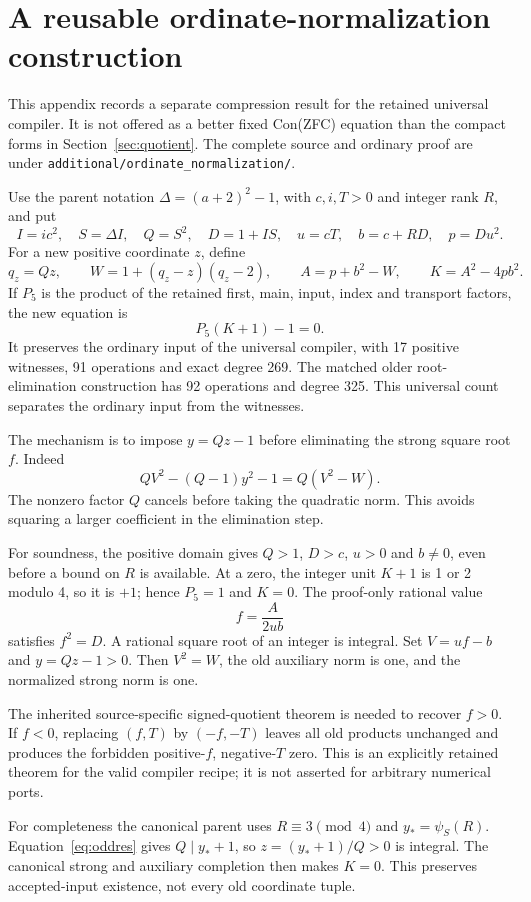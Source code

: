 \documentclass[11pt]{article}
\theoremstyle{remark}\newtheorem{remark}[theorem]{Remark}
\newcommand{\file}[1]{\nolinkurl{#1}}
\begin{document}


\section{A reusable ordinate-normalization construction}\label{app:ordinate}
This appendix records a separate compression result for the retained
universal compiler. It is not offered as a better fixed Con(ZFC)
equation than the compact forms in Section~\ref{sec:quotient}.
The complete source and ordinary proof are under
\file{additional/ordinate_normalization/}.

Use the parent notation $\Delta=(a+2)^2-1$, with $c,i,T>0$ and
integer rank $R$, and put
\[
 I=ic^2,\quad S=\Delta I,\quad Q=S^2,\quad D=1+IS,
 \quad u=cT,\quad b=c+RD,\quad p=Du^2.
\]
For a new positive coordinate $z$, define
\[
 q_z=Qz,\qquad W=1+(q_z-z)(q_z-2),\qquad
 A=p+b^2-W,\qquad K=A^2-4pb^2.
\]
If $P_5$ is the product of the retained first, main, input, index and
transport factors, the new equation is
\[
 P_5(K+1)-1=0.
\]
It preserves the ordinary input of the universal compiler, with 17
positive witnesses, 91 operations and exact degree 269. The matched
older root-elimination construction has 92 operations and degree 325.
This universal count separates the ordinary input from the witnesses.

The mechanism is to impose $y=Qz-1$ before eliminating the strong
square root $f$. Indeed
\[
 QV^2-(Q-1)y^2-1=Q(V^2-W).
\]
The nonzero factor $Q$ cancels before taking the quadratic norm.
This avoids squaring a larger coefficient in the elimination step.

For soundness, the positive domain gives $Q>1$, $D>c$, $u>0$ and
$b\ne0$, even before a bound on $R$ is available. At a zero, the
integer unit $K+1$ is 1 or 2 modulo 4, so it is $+1$; hence
$P_5=1$ and $K=0$. The proof-only rational value
\[
 f=\frac{A}{2ub}
\]
satisfies $f^2=D$. A rational square root of an integer is integral.
Set $V=uf-b$ and $y=Qz-1>0$. Then $V^2=W$, the old auxiliary norm
is one, and the normalized strong norm is one.

The inherited source-specific signed-quotient theorem is needed to
recover $f>0$. If $f<0$, replacing $(f,T)$ by $(-f,-T)$ leaves all
old products unchanged and produces the forbidden positive-$f$,
negative-$T$ zero. This is an explicitly retained theorem for the valid
compiler recipe; it is not asserted for arbitrary numerical ports.

For completeness the canonical parent uses $R\equiv3\pmod4$ and
$y_* =\psi_S(R)$. Equation~\eqref{eq:oddres} gives $Q\mid y_*+1$,
so $z=(y_*+1)/Q>0$ is integral. The canonical strong and auxiliary
completion then makes $K=0$. This preserves accepted-input existence,
not every old coordinate tuple.
\end{document}
